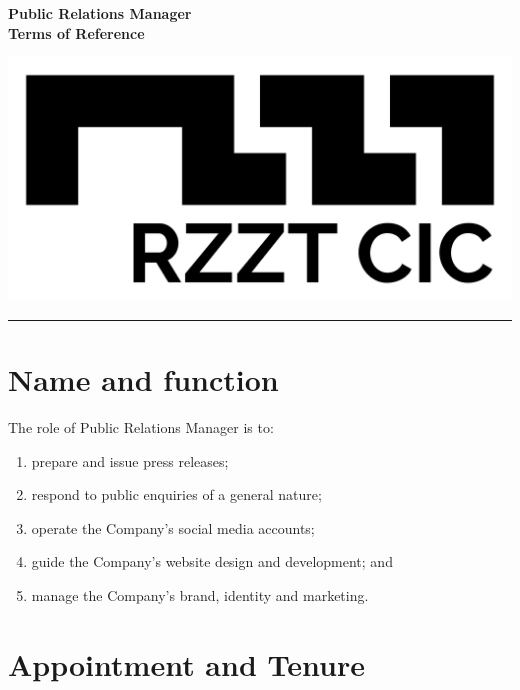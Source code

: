 \documentclass[a4paper,10pt]{article}
\renewcommand{\labelenumi}{(\arabic{enumi})}
\begin{document}
\thispagestyle{firstpage}

\begin{minipage}[b]{0.75\textwidth}
  \raggedright
  \LARGE{\textbf{Public Relations Manager\\Terms of Reference}}
  \vspace{0.05em}
\end{minipage}
%
\begin{minipage}[b]{0.25\textwidth}
  \raggedleft
  \includegraphics[width=1\textwidth]{logo-black.jpg}
\end{minipage}

\hrule

\vspace{2em}

\section{Name and function}

The role of Public Relations Manager is to:

\begin{enumerate}
    \renewcommand{\labelenumi}{(\alph{enumi})}
    \item prepare and issue press releases;
    \item respond to public enquiries of a general nature;
    \item operate the Company’s social media accounts;
    \item guide the Company’s website design and development; and
    \item manage the Company’s brand, identity and marketing.
\end{enumerate}

\section{Appointment and Tenure}
\end{document}
